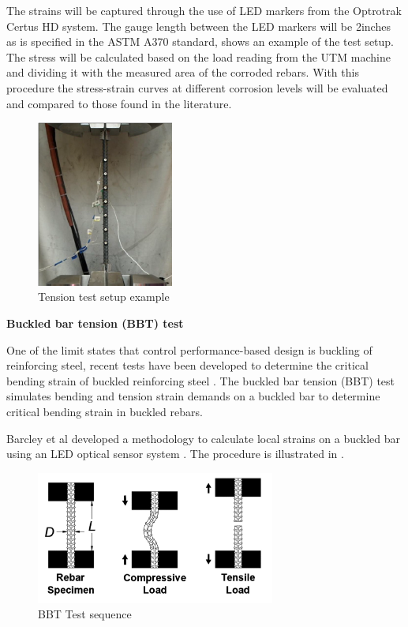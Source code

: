 The strains will be captured through the use of LED markers from the Optrotrak Certus HD system. The gauge length between the LED markers will be 2inches as is specified in the ASTM A370 standard,  shows an example of the test setup. The stress will be calculated based on the load reading from the UTM machine and dividing it with the measured area of the corroded rebars. With this procedure the stress-strain curves at different corrosion levels will be evaluated and compared to those found in the literature.

\begin{figure}[htbp]
	\centering
	\includegraphics[width=0.4\textwidth]{Chapter-3/figs/TensionTest}
	\caption{Tension test setup example\cite{Overby2016}}
	\label{fig:TensionTest}
\end{figure}
\newpage

\textbf{Buckled bar tension (BBT) test}

One of the limit states that control performance-based design is buckling of reinforcing steel, recent tests have been developed to determine the critical bending strain of buckled reinforcing steel \cite{Barcley2019}. The buckled bar tension (BBT) test simulates bending and tension strain demands on a buckled bar to determine critical bending strain in buckled rebars. 

Barcley et al \cite{Barcley2019} developed a methodology to calculate local strains on a buckled bar using an LED optical sensor system \cite{NorthernDigitalInc.2020}. The procedure is illustrated in .

\begin{figure}[htbp]
	\centering
	\includegraphics[width=0.7\textwidth]{Chapter-3/figs/BBT_Sequence}
	\caption{BBT Test sequence\cite{Barcley2019}}
	\label{fig:BBTseq}
\end{figure}

